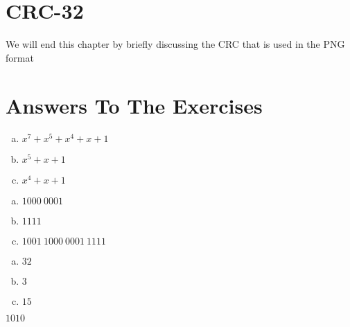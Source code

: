 \section{CRC-32}

We will end this chapter by briefly discussing the CRC that is used in
the PNG format


\section{Answers To The Exercises}

\begin{Answer}[ref={bin-to-poly}]
  \begin{enumerate}[(a)]
  \item $x^7 + x^5 + x^4 + x + 1$
  \item $x^5+ x + 1$
  \item $x^4 + x + 1$
  \end{enumerate}
\end{Answer}

\begin{Answer}[ref={poly-to-bin}]
  \begin{enumerate}[(a)]
  \item $1000\ 0001$
  \item $1111$
  \item $1001\ 1000\ 0001\ 1111$
  \end{enumerate}
\end{Answer}

\begin{Answer}[ref={width-poly}]

  \begin{enumerate}[(a)]
  \item $32$
  \item $3$
  \item $15$
  \end{enumerate}

\end{Answer}

\begin{Answer}[ref={poly-add}]

  $1010$

\end{Answer}

